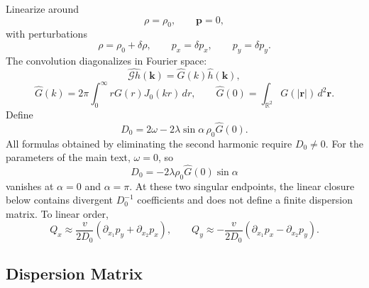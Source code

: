 \documentclass[11pt]{article}
\numberwithin{equation}{section}
\begin{document}
Linearize around
\begin{equation}
  \rho=\rho_0,\qquad \mathbf p=0,
\end{equation}
with perturbations
\begin{equation}
  \rho=\rho_0+\delta\rho,\qquad
  p_x=\delta p_x,\qquad
  p_y=\delta p_y .
\end{equation}
The convolution diagonalizes in Fourier space:
\begin{equation}
  \widehat{\mathcal Gh}(\mathbf k)=\widehat G(k)\widehat h(\mathbf k),
\end{equation}
\begin{equation}
  \widehat G(k)=2\pi\int_0^\infty rG(r)J_0(kr)\,dr,
  \qquad
  \widehat G(0)=\int_{\mathbb R^2}G(|\mathbf r|)\,d^2\mathbf r .
\end{equation}
Define
\begin{equation}
  D_0=2\omega-2\lambda\sin\alpha\,\rho_0\widehat G(0).
\end{equation}
All formulas obtained by eliminating the second harmonic require
$D_0\ne0$. For the parameters of the main text, $\omega=0$, so
\begin{equation}
  D_0=-2\lambda\rho_0\widehat G(0)\sin\alpha
\end{equation}
vanishes at $\alpha=0$ and $\alpha=\pi$. At these two singular endpoints,
the linear closure below contains divergent $D_0^{-1}$ coefficients and
does not define a finite dispersion matrix.
To linear order,
\begin{equation}
  Q_x\approx\frac{v}{2D_0}(\partial_{x_1}p_y+\partial_{x_2}p_x),
  \qquad
  Q_y\approx-\frac{v}{2D_0}(\partial_{x_1}p_x-\partial_{x_2}p_y).
\end{equation}

\subsection{Dispersion Matrix}
\end{document}
